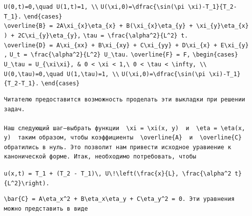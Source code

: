 \documentclass[
  ukrainian,
]{article}
\begin{document}
\texttt{U(0,t)=0,\textbackslash{}quad\ U(1,t)=1,\ \textbackslash{}\textbackslash{}}
\texttt{U(\textbackslash{}xi,0)=\textbackslash{}dfrac\{\textbackslash{}sin(\textbackslash{}pi\ \textbackslash{}xi)-T\_1\}\{T\_2-T\_1\}.}
\texttt{\textbackslash{}end\{cases\}}
\texttt{\textbackslash{}overline\{B\}\ =\ 2A\textbackslash{}xi\_\{x\}\textbackslash{}eta\_\{x\}\ +\ B(\textbackslash{}xi\_\{x\}\textbackslash{}eta\_\{y\}\ +\ \textbackslash{}xi\_\{y\}\textbackslash{}eta\_\{x\})\ +\ 2C\textbackslash{}xi\_\{y\}\textbackslash{}eta\_\{y\},}
\texttt{\textbackslash{}tau\ =\ \textbackslash{}frac\{\textbackslash{}alpha\^{}2\}\{L\^{}2\}\ t.}
\texttt{\textbackslash{}overline\{D\}\ =\ A\textbackslash{}xi\_\{xx\}\ +\ B\textbackslash{}xi\_\{xy\}\ +\ C\textbackslash{}xi\_\{yy\}\ +\ D\textbackslash{}xi\_\{x\}\ +\ E\textbackslash{}xi\_\{y\},}
\texttt{U\_t\ =\ \textbackslash{}frac\{\textbackslash{}alpha\^{}2\}\{L\^{}2\}\ U\_\textbackslash{}tau.}
\texttt{\textbackslash{}overline\{F\}\ =\ F,}
\texttt{\textbackslash{}begin\{cases\}}
\texttt{U\_\textbackslash{}tau\ =\ U\_\{\textbackslash{}xi\textbackslash{}xi\},\ \&\ 0\ \textless{}\ \textbackslash{}xi\ \textless{}\ 1,\textbackslash{}\ 0\ \textless{}\ \textbackslash{}tau\ \textless{}\ \textbackslash{}infty,\ \textbackslash{}\textbackslash{}}
\texttt{U(0,\textbackslash{}tau)=0,\textbackslash{}quad\ U(1,\textbackslash{}tau)=1,\ \textbackslash{}\textbackslash{}}
\texttt{U(\textbackslash{}xi,0)=\textbackslash{}dfrac\{\textbackslash{}sin(\textbackslash{}pi\ \textbackslash{}xi)-T\_1\}\{T\_2-T\_1\}.}
\texttt{\textbackslash{}end\{cases\}}

\begin{verbatim}
Читателю предоставится возможность проделать эти выкладки при решении задач.

Наш следующий шаг—выбрать функции  \xi = \xi(x, y)  и  \eta = \eta(x, y)  таким образом, чтобы коэффициенты  \overline{A}  и  \overline{C}  обратились в нуль. Это позволит нам привести исходное уравиение к канонической форме. Итак, необходимо потребовать, чтобы
\end{verbatim}

\texttt{u(x,t)\ =\ T\_1\ +\ (T\_2\ -\ T\_1)\textbackslash{},\ U\textbackslash{}!\textbackslash{}left(\textbackslash{}frac\{x\}\{L\},\ \textbackslash{}frac\{\textbackslash{}alpha\^{}2\ t\}\{L\^{}2\}\textbackslash{}right).}

\begin{verbatim}
\bar{C} = A\eta_x^2 + B\eta_x\eta_y + C\eta_y^2 = 0. Эти уравнения можно представить в виде
\end{verbatim}
\end{document}
